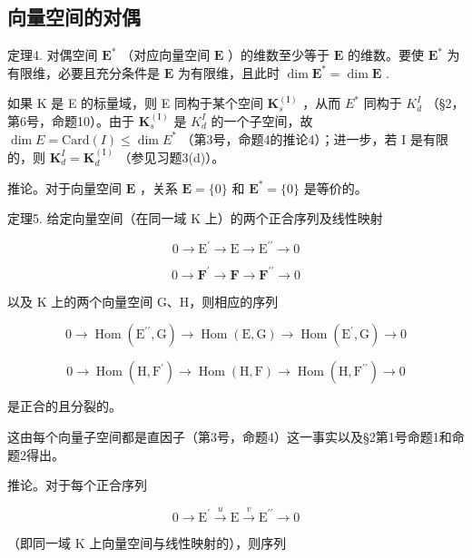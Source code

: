 \subsection{向量空间的对偶}

定理4. 对偶空间 \(\mathbf{E}^*\) （对应向量空间 \(\mathbf{E}\) ）的维数至少等于 \(\mathbf{E}\) 的维数。要使 \(\mathbf{E}^*\) 为有限维，必要且充分条件是 \(\mathbf{E}\) 为有限维，且此时 \(\dim \mathbf{E}^* = \dim \mathbf{E}\) .

如果 K 是 E 的标量域，则 E 同构于某个空间 \(\mathbf{K}_{s}^{\mathrm{(I)}}\) ，从而 \(E^{*}\) 同构于 \(K_{d}^{I}\) （§2，第6号，命题10）。由于 \(\mathbf{K}_{s}^{\mathrm{(I)}}\) 是 \(K_{d}^{I}\) 的一个子空间，故 \(\dim E = \text{Card}(I) \leqslant \dim E^{*}\) （第3号，命题4的推论4）；进一步，若 I 是有限的，则 \(\mathbf{K}_{d}^{I} = \mathbf{K}_{d}^{\mathrm{(I)}}\) （参见习题3(d)）。

推论。对于向量空间 \(\mathbf{E}\) ，关系 \(\mathbf{E} = \{0\}\) 和 \(\mathbf{E}^{*} = \{0\}\) 是等价的。

定理5. 给定向量空间（在同一域 K 上）的两个正合序列及线性映射

\[
0 \rightarrow \mathrm{E} ^ {\prime} \rightarrow \mathrm{E} \rightarrow \mathrm{E} ^ {\prime \prime} \rightarrow 0
\]

\[
0 \to \mathbf {F} ^ {\prime} \to \mathbf {F} \to \mathbf {F} ^ {\prime \prime} \to 0
\]

以及 K 上的两个向量空间 G、H，则相应的序列

\[
0 \rightarrow \operatorname{Hom} (\mathrm{E} ^ {\prime \prime}, \mathrm{G}) \rightarrow \operatorname{Hom} (\mathrm{E}, \mathrm{G}) \rightarrow \operatorname{Hom} (\mathrm{E} ^ {\prime}, \mathrm{G}) \rightarrow 0
\]

\[
0 \rightarrow \operatorname{Hom} (\mathrm{H}, \mathrm{F} ^ {\prime}) \rightarrow \operatorname{Hom} (\mathrm{H}, \mathrm{F}) \rightarrow \operatorname{Hom} (\mathrm{H}, \mathrm{F} ^ {\prime \prime}) \rightarrow 0
\]

是正合的且分裂的。

这由每个向量子空间都是直因子（第3号，命题4）这一事实以及§2第1号命题1和命题2得出。

推论。对于每个正合序列

\[
0 \longrightarrow \mathrm{E} ^ {\prime} \stackrel {u} {\longrightarrow} \mathrm{E} \stackrel {v} {\longrightarrow} \mathrm{E} ^ {\prime \prime} \longrightarrow 0
\]

（即同一域 K 上向量空间与线性映射的），则序列

